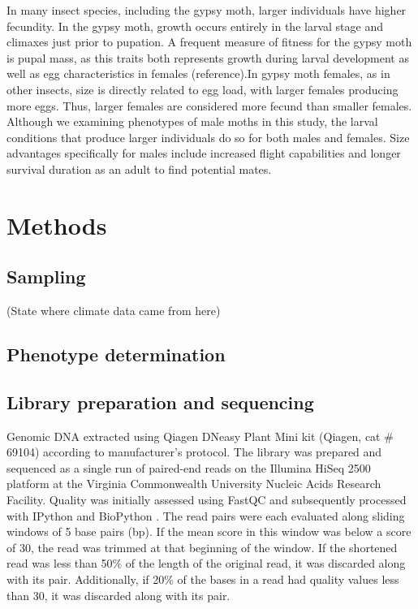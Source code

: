 \documentclass[smallextended]{svjour3}
\begin{document}
In many insect species, including the gypsy moth, larger individuals have higher
fecundity. In the gypsy moth, growth occurs entirely in the larval stage and
climaxes just prior to pupation. A frequent measure of fitness for the gypsy
moth is pupal mass, as this traits both represents growth during larval
development as well as egg characteristics in females (reference).In gypsy moth
females, as in other insects, size is directly related to egg load, with larger
females producing more eggs. Thus, larger females are considered more fecund
than smaller females. Although we examining phenotypes of male moths in this
study, the larval conditions that produce larger individuals do so for both
males and females. Size advantages specifically for males include increased
flight capabilities and longer survival duration as an adult to find potential
mates.


\section*{Methods}

\subsection*{Sampling}

(State where climate data came from here)

\subsection*{Phenotype determination}

\subsection*{Library preparation and sequencing}

Genomic DNA extracted using Qiagen DNeasy Plant Mini kit (Qiagen, cat \# 69104)
according to manufacturer's protocol.  The library was prepared and sequenced as
a single run of paired-end reads on the Illumina HiSeq 2500 platform at the
Virginia Commonwealth University Nucleic Acids Research Facility. Quality was
initially assessed using FastQC \citep{fastqc} and subsequently processed with
IPython \citep{Perez:2007hy} and BioPython \citep{Cock:2009hj}. The read pairs
were each evaluated along sliding windows of 5 base pairs (bp).  If the mean
score in this window was below a score of 30, the read was trimmed at that
beginning of the window. If the shortened read was less than 50\% of the length
of the original read, it was discarded along with its pair. Additionally, if
20\% of the bases in a read had quality values less than 30, it was discarded
along with its pair.
\end{document}
